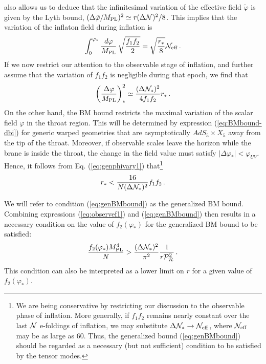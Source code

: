  also allows us to deduce 
that the infinitesimal variation of the effective 
field $\tilde{\varphi}$ is given by the Lyth bound, 
$(\Delta \tilde{\varphi} /M_{\mathrm{PL}} )^2 \simeq 
r (\Delta \mathcal{N})^2/8$. This implies that 
the variation of the inflaton field during inflation is 
% 
\begin{equation}
\label{eq:newphivar}
\int_0^{\varphi_{*}} \frac{d\varphi}{M_{\mathrm{PL}}} \, \sqrt{\frac{f_1f_2}{2}} 
= \sqrt{\frac{r_*}{8}}  \mathcal{N}_\mathrm{eff} \,.
\end{equation}
% 
If we now restrict our attention to 
the observable stage of inflation, and further assume that the variation
of $f_1f_2$ is negligible during that epoch, we find that 
% 
\begin{equation}
\label{eq:genphivary1}
\left( \frac{\Delta \varphi}{M_{\mathrm{PL}}} \right)^2_{*} \simeq 
\frac{(\Delta \mathcal{N}_{*} )^2}{4 f_1f_2} r_*  \,.
\end{equation}
% 
On the other hand, the BM bound restricts the maximal 
variation of the scalar field $\varphi$ in the throat region. 
This will be determined by expression (\ref{eq:BMbound-dbi}) 
for generic warped geometries that are asymptotically 
$AdS_5 \times X_5$ away from the tip of the throat. Moreover, 
if observable scales leave the horizon 
while the brane is inside the throat, the change in the field value 
must satisfy $| \Delta \varphi_*|<\varphi_{UV}$. Hence, it follows from   
Eq. (\ref{eq:genphivary1}) that\footnote{We are 
being conservative by restricting our discussion to the 
observable phase of inflation. More generally, if 
$f_1f_2$ remains nearly constant over the last $\mathcal{N}$ 
e-foldings of inflation, 
we may substitute $\Delta \mathcal{N}_* \rightarrow 
\mathcal{N}_\mathrm{eff}$, where $\mathcal{N}_\mathrm{eff}$ 
may be as large as 60. Thus, the generalized bound 
(\ref{eq:genBMbound}) should be regarded as a necessary 
(but not sufficient) condition to be satisfied by the tensor modes.} 
% 
\begin{equation}
\label{eq:genBMbound}
r_*< \frac{16}{N (\Delta \mathcal{N}_{*})^2} f_1f_2  \,.
\end{equation}
% 


We will refer to condition 
(\ref{eq:genBMbound}) as the 
generalized BM bound. 
Combining expressions (\ref{eq:observef1}) and (\ref{eq:genBMbound}) then
results in a necessary condition on the value of $f_2(\varphi_*)$ 
for the generalized BM bound to be satisfied:
%  
\begin{equation}
\label{eq:f2bound}
\frac{f_2 (\varphi_*)M_{\mathrm{PL}}^4}{N} > \frac{(\Delta \mathcal{N}_*)^2}{\pi^2} 
\frac{1}{r\mathcal{P}_{\mathcal{R}}^2 } \,.
\end{equation}
% 
This condition can also be interpreted as a lower limit on $r$ 
for a given value of $f_2 (\varphi_*)$.  


